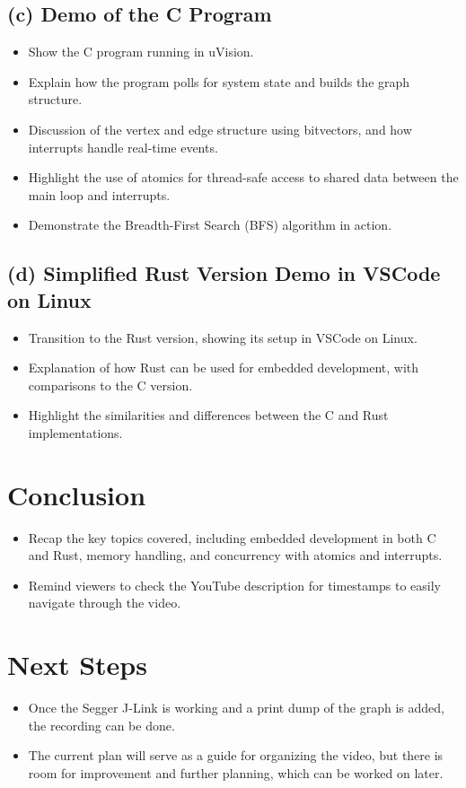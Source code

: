 \documentclass{article}
\begin{document}
\subsection{(c) Demo of the C Program}
\begin{itemize}
    \item Show the C program running in uVision.
    \item Explain how the program polls for system state and builds the graph structure.
    \item Discussion of the vertex and edge structure using bitvectors, and how interrupts handle real-time events.
    \item Highlight the use of atomics for thread-safe access to shared data between the main loop and interrupts.
    \item Demonstrate the Breadth-First Search (BFS) algorithm in action.
\end{itemize}

\subsection{(d) Simplified Rust Version Demo in VSCode on Linux}
\begin{itemize}
    \item Transition to the Rust version, showing its setup in VSCode on Linux.
    \item Explanation of how Rust can be used for embedded development, with comparisons to the C version.
    \item Highlight the similarities and differences between the C and Rust implementations.
\end{itemize}

\section{Conclusion}
\begin{itemize}
    \item Recap the key topics covered, including embedded development in both C and Rust, memory handling, and concurrency with atomics and interrupts.
    \item Remind viewers to check the YouTube description for timestamps to easily navigate through the video.
\end{itemize}

\section{Next Steps}
\begin{itemize}
    \item Once the Segger J-Link is working and a print dump of the graph is added, the recording can be done.
    \item The current plan will serve as a guide for organizing the video, but there is room for improvement and further planning, which can be worked on later.
\end{itemize}
\end{document}
